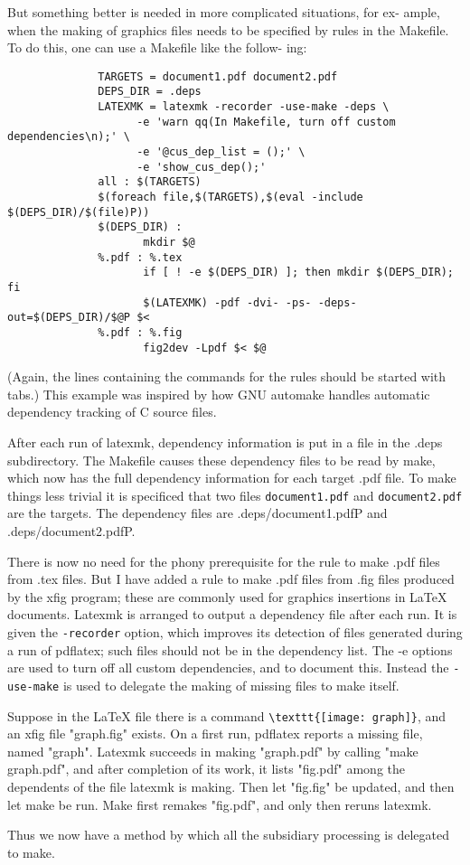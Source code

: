 But something better is needed in more complicated situations, for  ex-
ample, when the making of graphics files needs to be specified by rules
in the Makefile.  To do this, one can use a Makefile like  the  follow-
ing:

\begin{verbatim}
              TARGETS = document1.pdf document2.pdf
              DEPS_DIR = .deps
              LATEXMK = latexmk -recorder -use-make -deps \
                    -e 'warn qq(In Makefile, turn off custom dependencies\n);' \
                    -e '@cus_dep_list = ();' \
                    -e 'show_cus_dep();'
              all : $(TARGETS)
              $(foreach file,$(TARGETS),$(eval -include $(DEPS_DIR)/$(file)P))
              $(DEPS_DIR) :
                     mkdir $@
              %.pdf : %.tex
                     if [ ! -e $(DEPS_DIR) ]; then mkdir $(DEPS_DIR); fi
                     $(LATEXMK) -pdf -dvi- -ps- -deps-out=$(DEPS_DIR)/$@P $<
              %.pdf : %.fig
                     fig2dev -Lpdf $< $@
\end{verbatim}

(Again,  the  lines  containing  the  commands  for the rules should be started
with tabs.)  This example was inspired by how GNU automake handles automatic
dependency tracking of C source files.

After  each  run of latexmk, dependency information is put in a file in
the .deps subdirectory.  The Makefile causes these dependency files  to
be read by make, which now has the full dependency information for each target
.pdf file.  To make things less trivial it  is  specificed  that two  files
\verb|document1.pdf| and \verb|document2.pdf| are the targets.  The dependency files are
.deps/document1.pdfP and .deps/document2.pdfP.

There is now no need for the phony prerequisite for the  rule  to  make .pdf
files from .tex files.  But I have added a rule to make .pdf files from .fig
files produced by the xfig program; these are  commonly  used for  graphics
insertions  in  LaTeX documents.  Latexmk is arranged to output a dependency
file after each run.  It is given the \verb|-recorder| option,  which  improves its
detection of files generated during a run of pdflatex; such files should not be
in the dependency list.  The -e  options  are  used  to  turn off all custom
dependencies, and to document this.  Instead the \verb|-use-make| is used to delegate
the making of  missing files to make itself.

Suppose  in  the LaTeX file there is a command \verb|\texttt{[image: graph]}|, and an
xfig file "graph.fig" exists.  On a first run, pdflatex  reports a  missing
file, named "graph". Latexmk succeeds in making "graph.pdf" by calling "make
graph.pdf", and after completion of its work, it lists "fig.pdf" among the
dependents of the file latexmk is making.  Then let "fig.fig" be updated, and
then let make be  run.   Make  first  remakes "fig.pdf", and only then reruns
latexmk.

Thus  we  now  have  a method by which all the subsidiary processing is
delegated to make.




